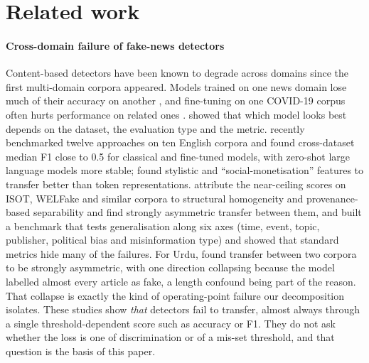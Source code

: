 \section{Related work}\label{sec:related}

\paragraph{Cross-domain failure of fake-news detectors}
Content-based detectors have been known to degrade across domains since the first multi-domain corpora appeared. Models trained on one news domain lose much of their accuracy on another \citep{perezrosas2018automatic,janicka2019crossdomain}, and fine-tuning on one COVID-19 corpus often hurts performance on related ones \citep{suprem2022generalizability}. \citet{bozarth2020evaluation} showed that which model looks best depends on the dataset, the evaluation type and the metric. \citet{delloglio2026comparison} recently benchmarked twelve approaches on ten English corpora and found cross-dataset median F1 close to 0.5 for classical and fine-tuned models, with zero-shot large language models more stable; \citet{hoy2025features} found stylistic and ``social-monetisation'' features to transfer better than token representations. \citet{calvo2026high} attribute the near-ceiling scores on ISOT, WELFake and similar corpora to structural homogeneity and provenance-based separability and find strongly asymmetric transfer between them, and \citet{verhoeven2026yesterday} built a benchmark that tests generalisation along six axes (time, event, topic, publisher, political bias and misinformation type) and showed that standard metrics hide many of the failures. For Urdu, \citet{haroon2026benchmarks} found transfer between two corpora to be strongly asymmetric, with one direction collapsing because the model labelled almost every article as fake, a length confound being part of the reason. That collapse is exactly the kind of operating-point failure our decomposition isolates. These studies show \emph{that} detectors fail to transfer, almost always through a single threshold-dependent score such as accuracy or F1. They do not ask whether the loss is one of discrimination or of a mis-set threshold, and that question is the basis of this paper.

